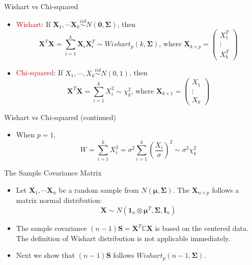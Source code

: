 \documentclass[
  ignorenonframetext,
]{beamer}
\providecommand{\tightlist}{%
  \setlength{\itemsep}{0pt}\setlength{\parskip}{0pt}}
\begin{document}
\begin{frame}{Wishart vs Chi-squared}
\protect\hypertarget{wishart-vs-chi-squared}{}
\begin{itemize}
\item
  \textcolor{red}{Wishart}: If
  \(\mathbf X_1, \cdots \mathbf X_k \overset{iid}\sim N(\mathbf 0, \boldsymbol \Sigma)\),
  then
  \[\mathbf X^T \mathbf X =\sum_{i=1}^k \mathbf X_i\mathbf X_i^T \sim Wishart_p(k, \boldsymbol \Sigma) \mbox{, where } \mathbf X_{k\times p}=\begin{pmatrix}
  X_1^T\\ \vdots\\ X_k^T
  \end{pmatrix}
  \]
\item
  \textcolor{red}{Chi-squared}: If
  \(X_1, \cdots, X_k \overset{iid}\sim N(0,1)\), then\\
  \[\mathbf X^T\mathbf X=\sum_{i=1}^k X_i^2\sim \chi_k^2 \mbox{, where } \mathbf X_{k\times 1}= 
  \begin{pmatrix}
  X_1 \\ \vdots \\ X_k
  \end{pmatrix}\]
\end{itemize}
\end{frame}

\begin{frame}{Wishart vs Chi-squared (continued)}
\protect\hypertarget{wishart-vs-chi-squared-continued}{}
\begin{itemize}
\tightlist
\item
  When \(p=1\),
  \[W=\sum_{i=1}^k X_i^2 = \sigma^2 \sum_{i=1}^k \left(\frac{X_i}{\sigma} \right)^2\sim \sigma^2 \chi_k^2 \]
\end{itemize}
\end{frame}

\begin{frame}{The Sample Covariance Matrix}
\protect\hypertarget{the-sample-covariance-matrix}{}
\begin{itemize}
\item
  Let \(\mathbf X_1, \cdots \mathbf X_n\) be a random sample from
  \(N(\boldsymbol \mu, \boldsymbol \Sigma)\). The
  \(\mathbf X_{n\times p}\) follows a matrix normal distribution:
  \[\mathbf X \sim N(\mathbf 1_n \otimes \boldsymbol \mu^T, \boldsymbol \Sigma, \mathbf I_n)\]
\item
  The sample covariance
  \((n-1)\mathbf S=\mathbf X^T \mathbb C \mathbf X\) is based on the
  centered data. The definition of Wishart distribution is not
  applicable immediately.
\item
  Next we show that \((n-1)\mathbf S\) follows
  \(Wishart_p(n-1, \boldsymbol\Sigma)\).
\end{itemize}
\end{frame}
\end{document}
